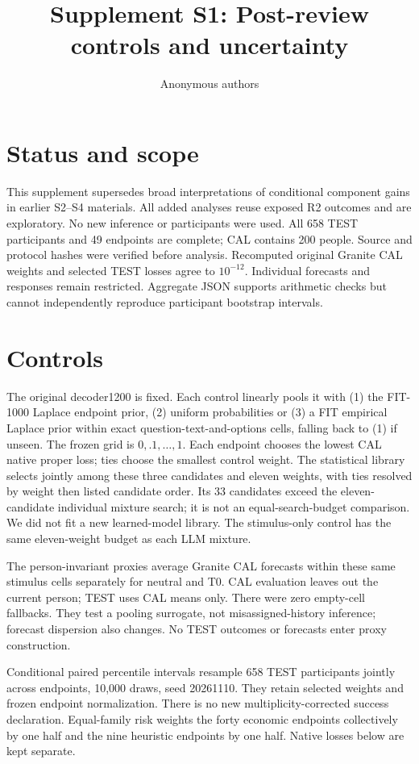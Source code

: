 \documentclass[10pt]{article}
\title{Supplement S1: Post-review controls and uncertainty}\author{Anonymous authors}\date{}
\begin{document}
\maketitle
\section{Status and scope}
This supplement supersedes broad interpretations of conditional component gains in earlier S2--S4 materials. All added analyses reuse exposed R2 outcomes and are exploratory. No new inference or participants were used. All 658 TEST participants and 49 endpoints are complete; CAL contains 200 people. Source and protocol hashes were verified before analysis. Recomputed original Granite CAL weights and selected TEST losses agree to $10^{-12}$. Individual forecasts and responses remain restricted. Aggregate JSON supports arithmetic checks but cannot independently reproduce participant bootstrap intervals.
\section{Controls}
The original decoder1200 is fixed. Each control linearly pools it with (1) the FIT-1000 Laplace endpoint prior, (2) uniform probabilities or (3) a FIT empirical Laplace prior within exact question-text-and-options cells, falling back to (1) if unseen. The frozen grid is $0,.1,\ldots,1$. Each endpoint chooses the lowest CAL native proper loss; ties choose the smallest control weight. The statistical library selects jointly among these three candidates and eleven weights, with ties resolved by weight then listed candidate order. Its 33 candidates exceed the eleven-candidate individual mixture search; it is not an equal-search-budget comparison. We did not fit a new learned-model library. The stimulus-only control has the same eleven-weight budget as each LLM mixture.

The person-invariant proxies average Granite CAL forecasts within these same stimulus cells separately for neutral and T0. CAL evaluation leaves out the current person; TEST uses CAL means only. There were zero empty-cell fallbacks. They test a pooling surrogate, not misassigned-history inference; forecast dispersion also changes. No TEST outcomes or forecasts enter proxy construction.

Conditional paired percentile intervals resample 658 TEST participants jointly across endpoints, 10,000 draws, seed 20261110. They retain selected weights and frozen endpoint normalization. There is no new multiplicity-corrected success declaration. Equal-family risk weights the forty economic endpoints collectively by one half and the nine heuristic endpoints by one half. Native losses below are kept separate.
\end{document}
